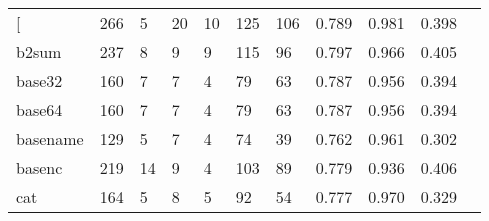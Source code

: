 \begin{longtable}{lp{1.10cm}p{1.10cm}p{1.10cm}p{1.10cm}p{1.10cm}p{1.10cm}p{1.10cm}p{1.10cm}p{1.10cm}p{1.10cm}}
\bottomrule
\endlastfoot
{[}         &                    266 &                                  5 &                                20 &                               10 &                               125 &                             106 &                             0.789 &                                 0.981 &                               0.398 \\
b2sum     &                    237 &                                  8 &                                 9 &                                9 &                               115 &                              96 &                             0.797 &                                 0.966 &                               0.405 \\
base32    &                    160 &                                  7 &                                 7 &                                4 &                                79 &                              63 &                             0.787 &                                 0.956 &                               0.394 \\
base64    &                    160 &                                  7 &                                 7 &                                4 &                                79 &                              63 &                             0.787 &                                 0.956 &                               0.394 \\
basename  &                    129 &                                  5 &                                 7 &                                4 &                                74 &                              39 &                             0.762 &                                 0.961 &                               0.302 \\
basenc    &                    219 &                                 14 &                                 9 &                                4 &                               103 &                              89 &                             0.779 &                                 0.936 &                               0.406 \\
cat       &                    164 &                                  5 &                                 8 &                                5 &                                92 &                              54 &                             0.777 &                                 0.970 &                               0.329 \\

\end{longtable}
